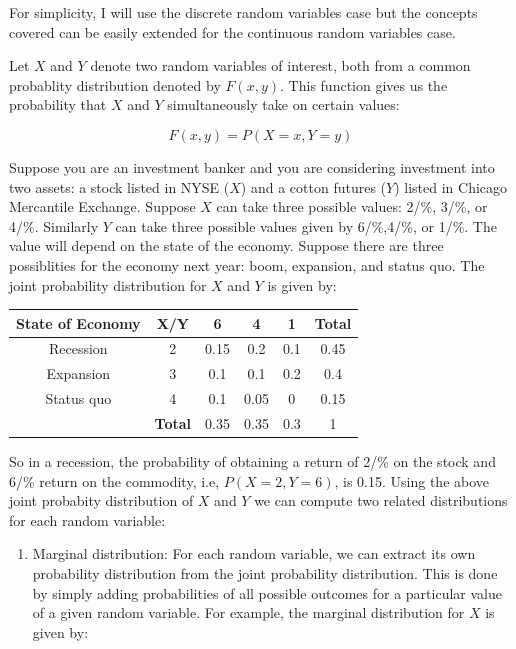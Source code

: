 \documentclass[]{book}
\providecommand{\tightlist}{%
  \setlength{\itemsep}{0pt}\setlength{\parskip}{0pt}}
\theoremstyle{definition}
\theoremstyle{definition}
\theoremstyle{definition}
\theoremstyle{remark}
\let\BeginKnitrBlock\begin \let\EndKnitrBlock\end
\begin{document}
For simplicity, I will use the discrete random variables case but the concepts covered can be easily extended for the continuous random variables case.

Let \(X\) and \(Y\) denote two random variables of interest, both from a common probablity distribution denoted by \(F(x,y)\). This function gives us the probability that \(X\) and \(Y\) simultaneously take on certain values:

\[F(x,y)=P(X=x, Y=y)\]

\BeginKnitrBlock{example}
\protect\hypertarget{exm:unnamed-chunk-56}{}{\label{exm:unnamed-chunk-56} }
Suppose you are an investment banker and you are considering investment into two assets: a stock listed in NYSE (\(X\)) and a cotton futures (\(Y\)) listed in Chicago Mercantile Exchange. Suppose \(X\) can take three possible values: 2/\%, 3/\%, or 4/\%. Similarly \(Y\) can take three possible values given by 6/\%,4/\%, or 1/\%. The value will depend on the state of the economy. Suppose there are three possiblities for the economy next year: boom, expansion, and status quo. The joint probability distribution for \(X\) and \(Y\) is given by:

\begin{longtable}[]{@{}cccccc@{}}
\toprule
State of Economy & X/Y & 6 & 4 & 1 & Total\tabularnewline
\midrule
\endhead
Recession & 2 & 0.15 & 0.2 & 0.1 & 0.45\tabularnewline
Expansion & 3 & 0.1 & 0.1 & 0.2 & 0.4\tabularnewline
Status quo & 4 & 0.1 & 0.05 & 0 & 0.15\tabularnewline
& \textbf{Total} & 0.35 & 0.35 & 0.3 & 1\tabularnewline
\bottomrule
\end{longtable}
\EndKnitrBlock{example}

So in a recession, the probability of obtaining a return of 2/\% on the stock and 6/\% return on the commodity, i.e, \(P(X=2,Y=6)\), is 0.15.
Using the above joint probabity distribution of \(X\) and \(Y\) we can compute two related distributions for each random variable:

\begin{enumerate}
\def\labelenumi{\arabic{enumi}.}
\tightlist
\item
  Marginal distribution: For each random variable, we can extract its own probability distribution from the joint probability distribution. This is done by simply adding probabilities of all possible outcomes for a particular value of a given random variable. For example, the marginal distribution for \(X\) is given by:
\end{enumerate}
\end{document}
